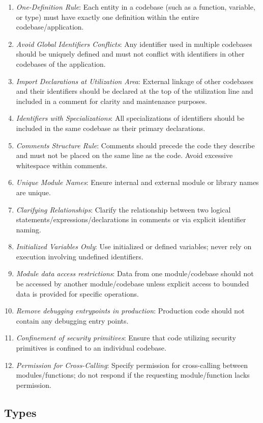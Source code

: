 \documentclass[9pt]{IEEEtran} %
\begin{document}
\begin{enumerate}
  \item \textit{One-Definition Rule}: Each entity in a codebase (such as a function, variable, or type) must have exactly one definition within the entire codebase/application.
  \item \textit{Avoid Global Identifiers Conflicts}: Any identifier used in multiple codebases should be uniquely defined and must not conflict with identifiers in other codebases of the application.
  \item \textit{Import Declarations at Utilization Area}: External linkage of other codebases and their identifiers should be declared at the top of the utilization line and included in a comment for clarity and maintenance purposes.
  \item \textit{Identifiers with Specializations}: All specializations of identifiers should be included in the same codebase as their primary declarations.
  \item \textit{Comments Structure Rule}: Comments should precede the code they describe and must not be placed on the same line as the code. Avoid excessive whitespace within comments.
  \item \textit{Unique Module Names}: Ensure internal and external module or library names are unique.
  \item \textit{Clarifying Relationships}: Clarify the relationship between two logical statements/expressions/declarations in comments or via explicit identifier naming.
  \item \textit{Initialized Variables Only}: Use initialized or defined variables; never rely on execution involving undefined identifiers.
  \item \textit{Module data access restrictions}: Data from one module/codebase should not be accessed by another module/codebase unless explicit access to bounded data is provided for specific operations.
  \item \textit{Remove debugging entrypoints in production}: Production code should not contain any debugging entry points.
  \item \textit{Confinement of security primitives}: Ensure that code utilizing security primitives is confined to an individual codebase.
  \item \textit{Permission for Cross-Calling}: Specify permission for cross-calling between modules/functions; do not respond if the requesting module/function lacks permission.
\end{enumerate}

\subsection{Types}
\label{ESSTypes}
\end{document}
